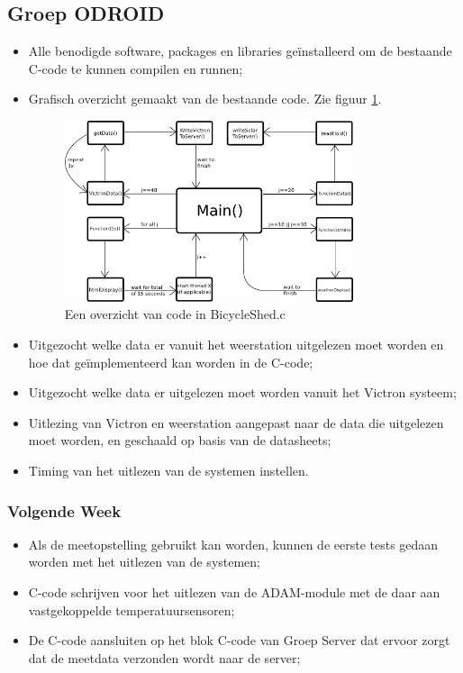\subsection*{Groep ODROID}
\begin{itemize}
\item Alle benodigde software, packages en libraries ge\"installeerd om de bestaande C-code te kunnen compilen en runnen;
\item Grafisch overzicht gemaakt van de bestaande code. Zie figuur \ref{bicyleshed}.

\begin{figure}[htbp]
\centering
\includegraphics[width=0.8\textwidth]{images/ODROID_code_overview.png}
\caption{Een overzicht van code in BicycleShed.c}
\label{bicyleshed}
\end{figure}

\item Uitgezocht welke data er vanuit het weerstation uitgelezen moet worden en hoe dat ge\"implementeerd kan worden in de C-code;
\item Uitgezocht welke data er uitgelezen moet worden vanuit het Victron systeem;
\item Uitlezing van Victron en weerstation aangepast naar de data die uitgelezen moet worden, en geschaald op basis van de datasheets;
\item Timing van het uitlezen van de systemen instellen.
\end{itemize}

\subsubsection*{Volgende Week}
\begin{itemize}
\item Als de meetopstelling gebruikt kan worden, kunnen de eerste tests gedaan worden met het uitlezen van de systemen;
\item C-code schrijven voor het uitlezen van de ADAM-module met de daar aan vastgekoppelde temperatuursensoren;
\item De C-code aansluiten op het blok C-code van Groep Server dat ervoor zorgt dat de meetdata verzonden wordt naar de server;
\end{itemize}